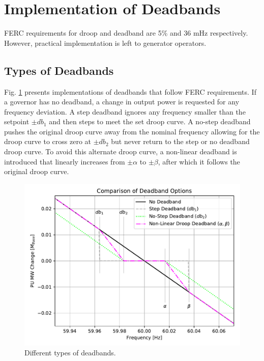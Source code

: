 \section{Implementation of Deadbands}
FERC requirements for droop and deadband are 5\% and 36 mHz respectively\cite{ferc2018}.
However, practical implementation is left to generator operators.

\subsection{Types of Deadbands}
Fig. \ref{fig: deadbandType} presents implementations of deadbands that follow FERC requirements.
If a governor has no deadband, a change in output power is requested for any frequency deviation.
A step deadband ignores any frequency smaller than the setpoint $\pm db_1$ and then steps to meet the set droop curve.
A no-step deadband pushes the original droop curve away from the nominal frequency allowing for the droop curve to cross zero at $\pm db_2$ but never return to the step or no deadband droop curve.
To avoid this alternate droop curve, a non-linear deadband is introduced that linearly increases from $\pm \alpha$ to $\pm \beta$, after which it follows the original droop curve.

\begin{figure}[!ht]
	\centering
	\includegraphics[width=\linewidth]{figures/dbAction3}
	\caption{Different types of deadbands.}
	\label{fig: deadbandType}
\end{figure}